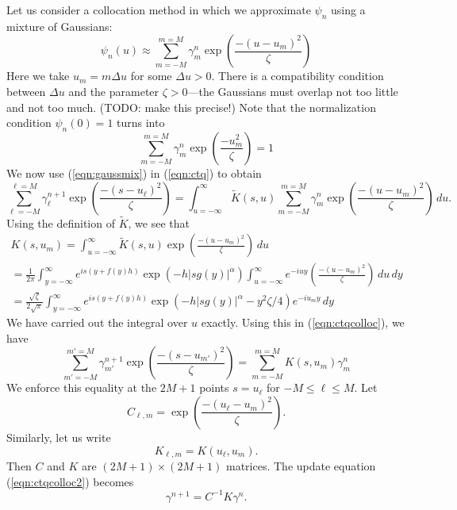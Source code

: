 \documentclass[11pt,letterpaper]{article}
\begin{document}
Let us consider a collocation method in which we approximate $\psi_n$ using a mixture of Gaussians:
\begin{equation}
\label{eqn:gaussmix}
\psi_n(u) \approx \sum_{m=-M}^{m=M} \gamma^n_m \exp \left( \frac{-(u - u_m)^2}{\zeta} \right)
\end{equation}
Here we take $u_m = m \Delta u$ for some $\Delta u > 0$.  There is a compatibility condition between $\Delta u$ and the parameter $\zeta > 0$---the Gaussians must overlap not too little and not too much.  (TODO: make this precise!)  Note that the normalization condition $\psi_n(0) = 1$ turns into
\begin{equation}
\label{eqn:collocnorm}
\sum_{m=-M}^{m=M} \gamma^n_m \exp \left( \frac{-u_m^2}{\zeta} \right) = 1
\end{equation}
We now use (\ref{eqn:gaussmix}) in (\ref{eqn:ctq}) to obtain
\begin{equation}
\label{eqn:ctqcolloc}
\sum_{\ell=-M}^{\ell=M} \gamma^{n+1}_{\ell} \exp \left( \frac{-(s - u_{\ell})^2}{\zeta} \right) = \int_{u=-\infty}^{\infty} \widetilde{K}(s,u) \sum_{m=-M}^{m=M} \gamma^n_m \exp \left( \frac{-(u - u_m)^2}{\zeta} \right) \, du.
\end{equation}
Using the definition of $\widetilde{K}$, we see that
\begin{multline}
\label{eqn:Kdef}
K(s, u_m) = \int_{u=-\infty}^{\infty} \widetilde{K}(s,u) \exp \left( \frac{-(u - u_m)^2}{\zeta} \right) \, du \\
= \frac{1}{2 \pi} \int_{y=-\infty}^\infty e^{i s (y + f(y) h) } \exp(-h |s g(y)|^\alpha) \int_{u=-\infty}^\infty e^{-i u y} \left( \frac{-(u - u_m)^2}{\zeta} \right) \, du \, dy \\
= \frac{\sqrt{\zeta}}{2 \sqrt{\pi}} \int_{y=-\infty}^\infty e^{i s (y + f(y) h) } \exp(-h |s g(y)|^\alpha -y^2 \zeta/4) e^{-i u_m y} \, dy
\end{multline}
We have carried out the integral over $u$ exactly.  Using this in (\ref{eqn:ctqcolloc}), we have
\begin{equation}
\label{eqn:ctqcolloc2}
\sum_{m'=-M}^{m'=M} \gamma^{n+1}_{m'} \exp \left( \frac{-(s - u_{m'})^2}{\zeta} \right) = \sum_{m=-M}^{m=M} K(s,u_m) \gamma^n_m
\end{equation}
We enforce this equality at the $2M+1$ points $s = u_{\ell}$ for $-M \leq \ell \leq M$.  Let
$$
C_{\ell, m} = \exp \left( \frac{-(u_{\ell} - u_{m})^2}{\zeta} \right).
$$
Similarly, let us write
$$
K_{\ell, m} = K(u_{\ell}, u_m).
$$
Then $C$ and $K$ are $(2M+1) \times (2M+1)$ matrices.  The update equation (\ref{eqn:ctqcolloc2}) becomes
\begin{equation}
\label{eqn:collocupdate}
\gamma^{n+1} = C^{-1} K \gamma^n.
\end{equation}
\end{document}
